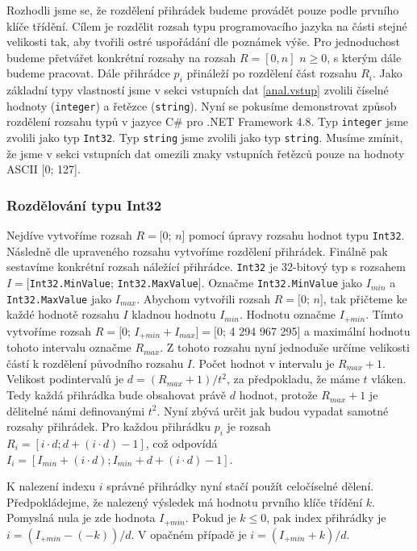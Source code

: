 Rozhodli jsme se, že rozdělení přihrádek budeme provádět pouze podle prvního klíče třídění.
Cílem je rozdělit rozsah typu programovacího jazyka na části stejné velikosti tak, aby tvořili ostré uspořádání dle poznámek výše.
Pro jednoduchost budeme přetvářet konkrétní rozsahy na rozsah $R=[0, n]$ $n \ge 0$, s kterým dále budeme pracovat.
Dále přihrádce $p_i$ přináleží po rozdělení část rozsahu $R_i$.
Jako základní typy vlastností jsme v sekci vstupních dat \ref{anal.vstup} zvolili číselné hodnoty (\texttt{integer}) a řetězce (\texttt{string}). 
Nyní se pokusíme demonstrovat způsob rozdělení rozsahu typů v jazyce C\# pro .NET Framework 4.8.
Typ \texttt{integer} jsme zvolili jako typ \texttt{Int32}.
Typ \texttt{string} jsme zvolili jako typ \texttt{string}.
Musíme zmínit, že jsme v sekci vstupních dat omezili znaky vstupních řetězců pouze na hodnoty ASCII [0; 127]. 

\subsubsection{Rozdělování typu Int32}

Nejdíve vytvoříme rozsah $R=[$0; $n$] pomocí úpravy rozsahu hodnot typu \texttt{Int32}.
Následně dle upraveného rozsahu vytvoříme rozdělení přihrádek.
Finálně pak sestavíme konkrétní rozsah náležící přihrádce.
\texttt{Int32} je 32-bitový typ s rozsahem $I=[$\texttt{Int32.MinValue}; \texttt{Int32.MaxValue}$]$.
Označme \texttt{Int32.MinValue} jako $I_{min}$ a \texttt{Int32.MaxValue} jako $I_{max}$.
Abychom vytvořili rozsah $R=[$0; $n$], tak přičteme ke každé hodnotě rozsahu $I$ kladnou hodnotu $I_{min}$.
Hodnotu označme $I_{+min}$.
Tímto vytvoříme rozsah $R=[0$; $I_{+min}+I_{max}$$]=[0$; 4 294 967 295] a maximální hodnotu tohoto intervalu označme $R_{max}$.
Z tohoto rozsahu nyní jednoduše určíme velikosti částí k rozdělení původního rozsahu $I$.
Počet hodnot v intervalu je $R_{max}+1$.
Velikost podintervalů je $d=(R_{max}+1)/t^2$, za předpokladu, že máme $t$ vláken.
Tedy každá přihrádka bude obsahovat právě $d$ hodnot, protože $R_{max}+1$ je dělitelné námi definovanými $t^2$.
Nyní zbývá určit jak budou vypadat samotné rozsahy přihrádek.
Pro každou přihrádku $p_i$ je rozsah $R_i=[i \cdot d; d+(i \cdot d)-1]$, což odpovídá $I_i=[I_{min}+(i \cdot d); I_{min}+d+(i \cdot d)-1]$.

K nalezení indexu $i$ správné přihrádky nyní stačí použít celočíselné dělení.
Předpokládejme, že nalezený výsledek má hodnotu prvního klíče třídění $k$.
Pomyslná nula je zde hodnota $I_{+min}$.
Pokud je $k \leq 0$, pak index přihrádky je $i=(I_{+min}-(-k))/d$.
V opačném případě je $i=(I_{+min}+k)/d$.

